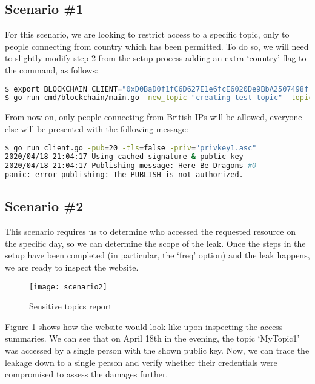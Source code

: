 \subsection{Scenario \#1}
For this scenario, we are looking to restrict access to a specific topic, only to people connecting from country which has been permitted. To do so, we will need to slightly modify step 2 from the setup process adding an extra `country' flag to the command, as follows:
\begin{lstlisting}[language=bash,breaklines=true]
$ export BLOCKCHAIN_CLIENT="0xD0BaD0f1fC6D627E1e6fcE6020De9BbA2507498f"
$ go run cmd/blockchain/main.go -new_topic "creating test topic" -topic "RestrictedTopic" -country="GB"
\end{lstlisting}
From now on, only people connecting from British IPs will be allowed, everyone else will be presented with the following message:
\begin{lstlisting}[language=bash,breaklines=true]
$ go run client.go -pub=20 -tls=false -priv="privkey1.asc"
2020/04/18 21:04:17 Using cached signature & public key
2020/04/18 21:04:17 Publishing message: Here Be Dragons #0
panic: error publishing: The PUBLISH is not authorized.
\end{lstlisting}
\subsection{Scenario \#2}
This scenario requires us to determine who accessed the requested resource on the specific day, so we can determine the scope of the leak. Once the steps in the setup have been completed (in particular, the `freq' option) and the leak happens, we are ready to inspect the website.

\begin{figure}[h]
    \centering
    \texttt{[image: scenario2]}
    \caption{Sensitive topics report}
    \label{fig:scenario2}
\end{figure}
Figure \ref{fig:scenario2} shows how the website would look like upon inspecting the access summaries. We can see that on April 18th in the evening, the topic `MyTopic1' was accessed by a single person with the shown public key. Now, we can trace the leakage down to a single person and verify whether their credentials were compromised to assess the damages further.
